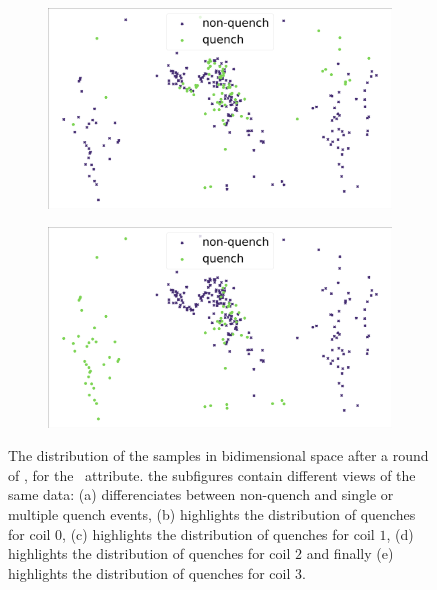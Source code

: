 \begin{figure}[!h]
\begin{subfigure}{0.49\linewidth}
		\subcaption{}
	\end{subfigure}
	\begin{subfigure}{0.49\linewidth}
		\includegraphics[width=\linewidth]{img/quench_dist_qlp/quenches_coil_2_Bn.png}
		\subcaption{}
	\end{subfigure}
	\begin{subfigure}{0.49\linewidth}
		\includegraphics[width=\linewidth]{img/quench_dist_qlp/quenches_coil_3_Bn.png}
		\subcaption{}
	\end{subfigure}
	\caption{The distribution of the samples in bidimensional space after a round of \pca, for
		the \bn\ attribute. the subfigures contain different views of the same data: (a) differenciates between non-quench and single or multiple quench events, (b) highlights the distribution of quenches for coil $0$, (c) highlights the distribution of quenches for coil $1$, (d) highlights the distribution of quenches for coil $2$ and finally (e) highlights the distribution of quenches for coil $3$.}
	\label{fig:bn-coilq-dist}
\end{figure}

